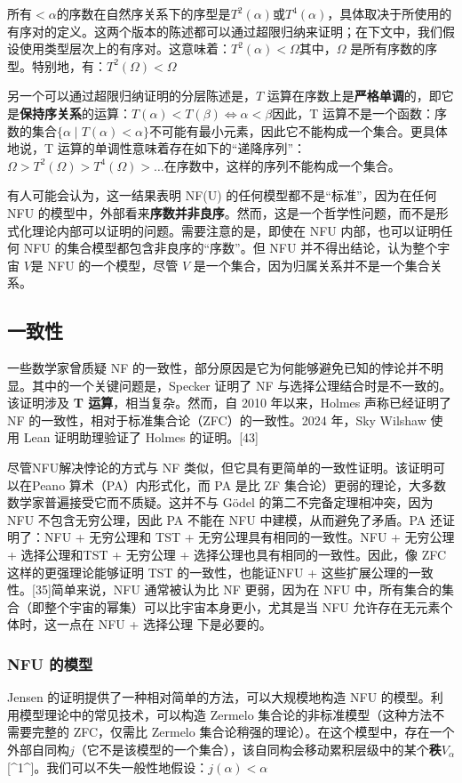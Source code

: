 所有\(<\alpha \)的序数在自然序关系下的序型是\( T^2(\alpha) \)或\( T^4(\alpha) \)，具体取决于所使用的有序对的定义。这两个版本的陈述都可以通过超限归纳来证明；在下文中，我们假设使用类型层次上的有序对。这意味着：\(T^2(\alpha) < \Omega\)其中，\( \Omega \) 是所有序数的序型。特别地，有：\(T^2(\Omega) < \Omega\)

另一个可以通过超限归纳证明的分层陈述是，\( T \) 运算在序数上是\textbf{严格单调}的，即它是\textbf{保持序关系}的运算：\(T(\alpha) < T(\beta) \iff \alpha < \beta\)因此，T 运算不是一个函数：序数的集合\(\{\alpha \mid T(\alpha) < \alpha\}\)不可能有最小元素，因此它不能构成一个集合。更具体地说，T 运算的单调性意味着存在如下的“递降序列”：\(\Omega > T^2(\Omega) > T^4(\Omega) > \dots\)在序数中，这样的序列不能构成一个集合。

有人可能会认为，这一结果表明 NF(U) 的任何模型都不是“标准”，因为在任何 NFU 的模型中，外部看来\textbf{序数并非良序}。然而，这是一个哲学性问题，而不是形式化理论内部可以证明的问题。需要注意的是，即使在 NFU 内部，也可以证明任何 NFU 的集合模型都包含非良序的“序数”。但 NFU 并不得出结论，认为整个宇宙 \( V \)是 NFU 的一个模型，尽管 \( V \) 是一个集合，因为归属关系并不是一个集合关系。
\subsection{一致性} 
一些数学家曾质疑 NF 的一致性，部分原因是它为何能够避免已知的悖论并不明显。其中的一个关键问题是，Specker 证明了 NF 与选择公理结合时是不一致的。该证明涉及 \textbf{T 运算}，相当复杂。然而，自 2010 年以来，Holmes 声称已经证明了 NF 的一致性，相对于标准集合论（ZFC）的一致性。2024 年，Sky Wilshaw 使用 Lean 证明助理验证了 Holmes 的证明。[43]  

尽管NFU解决悖论的方式与 NF 类似，但它具有更简单的一致性证明。该证明可以在Peano 算术（PA）内形式化，而 PA 是比 ZF 集合论）更弱的理论，大多数数学家普遍接受它而不质疑。这并不与 Gödel 的第二不完备定理相冲突，因为 NFU 不包含无穷公理，因此 PA 不能在 NFU 中建模，从而避免了矛盾。PA 还证明了：NFU + 无穷公理和 TST + 无穷公理具有相同的一致性。NFU + 无穷公理 + 选择公理和TST + 无穷公理 + 选择公理也具有相同的一致性。因此，像 ZFC 这样的更强理论能够证明 TST 的一致性，也能证NFU + 这些扩展公理的一致性。[35]简单来说，NFU 通常被认为比 NF 更弱，因为在 NFU 中，所有集合的集合（即整个宇宙的幂集）可以比宇宙本身更小，尤其是当 NFU 允许存在无元素个体时，这一点在 NFU + 选择公理 下是必要的。
\subsubsection{NFU 的模型} 
Jensen 的证明提供了一种相对简单的方法，可以大规模地构造 NFU 的模型。利用模型理论中的常见技术，可以构造 Zermelo 集合论的非标准模型（这种方法不需要完整的 ZFC，仅需比 Zermelo 集合论稍强的理论）。在这个模型中，存在一个外部自同构\( j \)（它不是该模型的一个集合），该自同构会移动累积层级中的某个\textbf{秩}\( V_{\alpha} \)[^1^]。我们可以不失一般性地假设：\(j(\alpha) < \alpha\)

